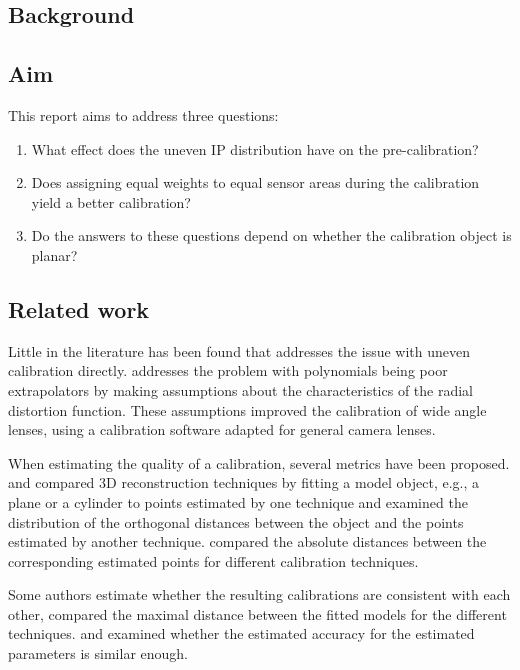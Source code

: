 \subsection{Background}
    \label{sec:background}


\subsection{Aim}
    \label{sec:aim}

    This report aims to address three questions:

    \begin{enumerate}
        \item What effect does the uneven IP distribution have on
            the pre-calibration?
        \item Does assigning equal weights to equal sensor areas
            during the calibration yield a better calibration?
        \item Do the answers to these questions depend on whether
            the calibration object is planar?
    \end{enumerate}

\subsection{Related work}
    \label{sec:related_work}

    Little in the literature has been found that addresses the issue
    with uneven calibration directly.
    \citet{jung_lee_yoon_inverse_mapping} addresses the problem with
    polynomials being poor extrapolators by making assumptions 
    about the characteristics of the radial distortion function.
    These assumptions improved the calibration of wide angle lenses,
    using a calibration software adapted for general camera lenses.

    When estimating the quality of a calibration,
    several metrics have been proposed.
    \citet{Rabbani2007:Integrated} and 
    \citet{Grussenmeyer2008:Comparison}
    compared 3D reconstruction techniques by fitting a model object,
    e.g., a plane or a cylinder to points estimated by one technique and
    examined the distribution of the orthogonal distances between the object and 
    the points estimated by another technique.
    \citet{Boehler2003:Investigating} compared the absolute distances between 
    the corresponding estimated points for different calibration techniques.

    Some authors estimate whether the resulting 
    calibrations are consistent with each other, 
    \citet{Rabbani2007:Integrated} compared the maximal distance between
    the fitted models for the different techniques.
    \citet{Dickscheid2008:benchmarking} and \citet{Labe2008:Quality}
    examined whether the estimated accuracy for the estimated parameters
    is similar enough.

